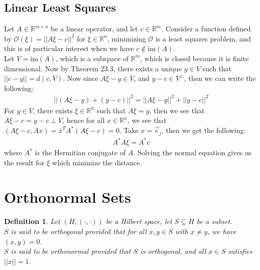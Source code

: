 \documentclass[11pt]{book}
\theoremstyle{break}
\theoremstyle{break}
\newtheorem{defn}{Definition}[corL]
\newcommand{\R}{\mathbb{R}}
\newcommand{\im}{\text{im}}
\begin{document}
\subsection{Linear Least Squares}
Let $A \in \R^{m\times n}$ be a linear operator, and let $c\in \R^m$. Consider a function defined by $\mathcal{O}(\xi) = ||A\xi - c||^2$ for $\xi \in \R^n$, minimizing $\mathcal{O}$ is a least squares problem, and this is of particular interest when we have $c \notin \im(A)$. \\

Let $V = \im(A)$, which is a subspace of $\R^m$, which is closed because it is finite dimensional. Now by Theorem 23.3, there exists a unique $y \in V$ such that $||c- y|| = d(c,V)$. Now since $A\xi - y \in V$, and $y-c \in V^{\perp}$, then we can write the following:
\begin{align*}
||(A\xi - y) + (y-c)||^2 = ||A\xi - y||^2 + ||y-c||^2
\end{align*}
For $y \in V$, there exists $\xi \in \R^n$ such that $A\xi = y$, then we see that $A\xi - c = y-c \perp V$, hence for all $x \in \R^n$, we see that $( A\xi -c, Ax)= \bar{x}^{T}A^*(A\xi - c) = 0$. Take $x = \vec{e}_j$, then we get the following:
\begin{align}
A^* A \xi = A^* c \tag{Normal Equation}
\end{align} 
where $A^*$ is the Hermitian conjugate of $A$. Solving the normal equation gives us the result for $\xi$ which minimize the distance. 

\newpage
\section[Orthonormal Sets]{\color{red} Orthonormal Sets\color{black}}
\begin{defn}
Let $(H,(\cdot, \cdot))$ be a Hilbert space, let $S\subseteq H$ be a subset. \\
$S$ is said to be orthogonal provided that for all $x,y \in S$ with $x \neq y$, we have $(x,y)=0$. \\
$S$ is said to be orthonormal provided that $S$ is orthogonal, and all $x \in S$ satisfies $||x|| = 1$.  
\end{defn}
\end{document}

